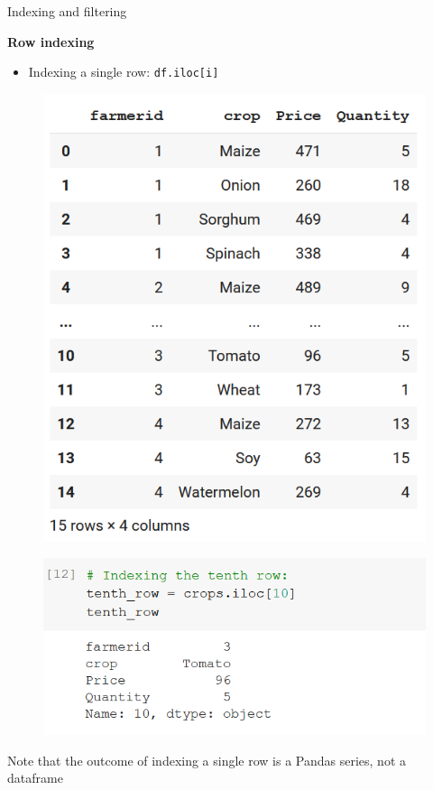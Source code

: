 \documentclass[aspectratio=169]{beamer}
\begin{document}
\begin{frame}{Indexing and filtering}

	\textbf{Row indexing}

	\begin{itemize}
		\item Indexing a single row: \texttt{df.iloc[i]}
	\end{itemize}

	\begin{multicols}{2}

		\begin{figure}
			\centering
			\includegraphics[width=0.5\linewidth]{img/dataframe.png}
		\end{figure}
		
		\begin{figure}
			\centering
			\includegraphics[width=\linewidth]{img/single_row.png}
		\end{figure}

	\end{multicols}

	Note that the outcome of indexing a single row is a Pandas series, not a dataframe

\end{frame}
\end{document}
